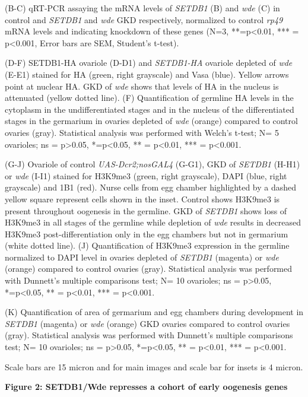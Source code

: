 \documentclass[12pt,oneside]{reedthesis}
\begin{document}
(B-C) qRT-PCR assaying the mRNA levels of \emph{SETDB1} (B) and \emph{wde} (C) in
control and \emph{SETDB1} and \emph{wde} GKD respectively, normalized to control
\emph{rp49} mRNA levels and indicating knockdown of these genes (N=3,
**=p\textless0.01, *** = p\textless0.001, Error bars are SEM, Student's t-test).

(D-F) SETDB1-HA ovariole (D-D1) and \emph{SETDB1-HA} ovariole depleted of
\emph{wde} (E-E1) stained for HA (green, right grayscale) and Vasa (blue).
Yellow arrows point at nuclear HA. GKD of \emph{wde} shows that levels of HA
in the nucleus is attenuated (yellow dotted line). (F) Quantification of
germline HA levels in the cytoplasm in the undifferentiated stages and
in the nucleus of the differentiated stages in the germarium in ovaries
depleted of \emph{wde} (orange) compared to control ovaries (gray).
Statistical analysis was performed with Welch's t-test; N= 5 ovarioles;
ns = p\textgreater0.05, *=p\textless0.05, ** = p\textless0.01, *** = p\textless0.001.

(G-J) Ovariole of control \emph{UAS-Dcr2;nosGAL4} (G-G1), GKD of \emph{SETDB1}
(H-H1) or \emph{wde} (I-I1) stained for H3K9me3 (green, right grayscale),
DAPI (blue, right grayscale) and 1B1 (red). Nurse cells from egg chamber
highlighted by a dashed yellow square represent cells shown in the
inset. Control shows H3K9me3 is present throughout oogenesis in the
germline. GKD of \emph{SETDB1} shows loss of H3K9me3 in all stages of the
germline while depletion of \emph{wde} results in decreased H3K9me3
post-differentiation only in the egg chambers but not in germarium
(white dotted line). (J) Quantification of H3K9me3 expression in the
germline normalized to DAPI level in ovaries depleted of \emph{SETDB1}
(magenta) or \emph{wde} (orange) compared to control ovaries (gray).
Statistical analysis was performed with Dunnett's multiple comparisons
test; N= 10 ovarioles; ns = p\textgreater0.05, *=p\textless0.05, ** = p\textless0.01, ***
= p\textless0.001.

(K) Quantification of area of germarium and egg chambers during
development in \emph{SETDB1} (magenta) or \emph{wde} (orange) GKD ovaries compared
to control ovaries (gray). Statistical analysis was performed with
Dunnett's multiple comparisons test; N= 10 ovarioles; ns = p\textgreater0.05,
*=p\textless0.05, ** = p\textless0.01, *** = p\textless0.001.

Scale bars are 15 micron and for main images and scale bar for insets is
4 micron.

\textbf{Figure 2: SETDB1/Wde represses a cohort of early oogenesis genes}
\end{document}
